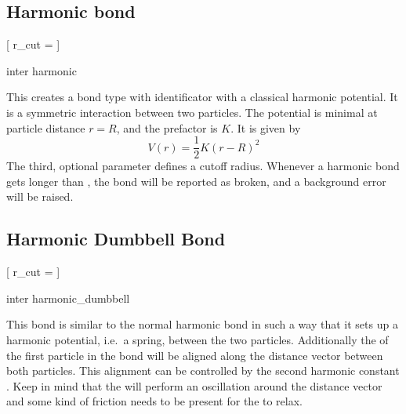 \subsection{Harmonic bond}

\begin{pysyntax}
  [
    r_cut = 
  ]
\end{pysyntax}

\begin{essyntax}
  inter 
  harmonic   
\end{essyntax}
This creates a bond type with identificator  with a
classical harmonic potential. It is a symmetric interaction between two
particles. The potential is minimal at particle distance $r=R$, and the
prefactor is $K$. It is given by
\begin{equation}
  V(r) = \frac{1}{2} K \left( r - R \right)^2
\end{equation}
The third, optional parameter  defines a cutoff
radius.  Whenever a harmonic bond gets longer than
, the bond will be reported as broken, and a
background error will be raised.

\subsection{Harmonic Dumbbell Bond}

\begin{pysyntax}
  [
    r_cut = 
  ]
\end{pysyntax}

\begin{essyntax}
  inter 
  harmonic_dumbbell    
  \begin{features}
  \end{features}
\end{essyntax}
This bond is similar to the normal harmonic bond in such a way that it
sets up a harmonic potential, i.e.\ a spring, between the two
particles.  Additionally the  of the first particle in
the bond will be aligned along the distance vector between both
particles.  This alignment can be controlled by the second harmonic
constant .  Keep in mind that the  will perform
an oscillation around the distance vector and some kind of friction
needs to be present for the  to relax.

